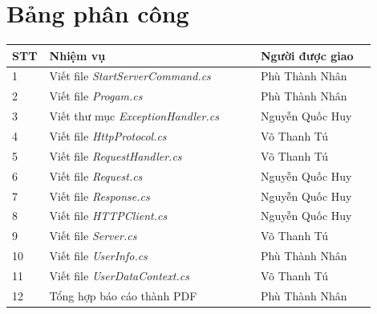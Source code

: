 \documentclass[14pt, a4paper]{extarticle}
\begin{document}
\section{Bảng phân công}
\begin{table}[h!]
    \centering
    \begin{tabular}{| p{0.05\linewidth}| p{0.55\linewidth}| p{0.30\linewidth}|}
        \hline
        \textbf{STT} & \textbf{Nhiệm vụ} & \textbf{Người được giao} \\
        \hline
        1   & Viết file \textit{StartServerCommand.cs} & Phù Thành Nhân\\
        \hline
        2   & Viết file \textit{Progam.cs} & Phù Thành Nhân\\
        \hline
        3   & Viết thư mục \textit{ExceptionHandler.cs} & Nguyễn Quốc Huy\\
        \hline
        4   & Viết file \textit{HttpProtocol.cs} & Võ Thanh Tú\\
        5   & Viết file \textit{RequestHandler.cs}      & Võ Thanh Tú\\
        6   & Viết file \textit{Request.cs}     & Nguyễn Quốc Huy\\
        7   & Viết file \textit{Response.cs}    & Nguyễn Quốc Huy\\
        \hline
        8   & Viết file \textit{HTTPClient.cs}  & Nguyễn Quốc Huy\\
        9   & Viết file \textit{Server.cs}      &
        Võ Thanh Tú\\
        \hline
        10  &Viết file \textit{UserInfo.cs}         & Phù Thành Nhân\\
        11  &Viết file \textit{UserDataContext.cs}  & Võ Thanh Tú\\
        \hline
        12  &Tổng hợp báo cáo thành PDF         & Phù Thành Nhân\\
        \hline
    \end{tabular}
\end{table}
\end{document}
